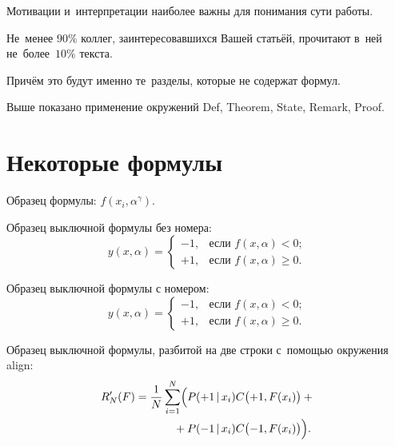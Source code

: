 \documentclass[12pt,twoside]{article}
\begin{document}
    \begin{State}
        Мотивации и~интерпретации наиболее важны для понимания сути работы.
    \end{State}
    
    \begin{Theorem}
        Не~менее $90\%$ коллег, заинтересовавшихся Вашей статьёй,
        прочитают в~ней не~более~$10\%$ текста.
    \end{Theorem}
    
    \begin{Proof}
        Причём это будут именно те~разделы, которые не содержат формул.
    \end{Proof}
    
    \begin{Remark}
        Выше показано применение окружений
        Def, Theorem, State, Remark, Proof.
    \end{Remark}
    
    \section{Некоторые формулы}
    
    Образец формулы: $f(x_i,\alpha^\gamma)$.
    
    Образец выключной формулы без номера:
    \[
        y(x,\alpha) =
        \begin{cases}
            -1, & \text{если } f(x,\alpha)<0;  \\
            +1, & \text{если } f(x,\alpha)\geq 0.
        \end{cases}
    \]
    
    Образец выключной формулы с номером:
    \begin{equation}
    \label{eq:cases}
        y(x,\alpha) =
        \begin{cases}
            -1, & \text{если } f(x,\alpha)<0;  \\
            +1, & \text{если } f(x,\alpha)\geq 0.
        \end{cases}
    \end{equation}
    
    Образец выключной формулы, разбитой на две строки с~помощью окружения align:
    \begin{align}
        R'_N(F)
            = \frac1N \sum_{i=1}^N
            \Bigl(
                & P(+1\cond x_i) C\bigl(+1,F(x_i)\bigr)+{}
            \notag %
        \\ {}+{}
                & P(-1\cond x_i) C\bigl(-1,F(x_i)\bigr)
            \Bigr).
            \label{eq:R(F)}
    \end{align}
    
\end{document}
